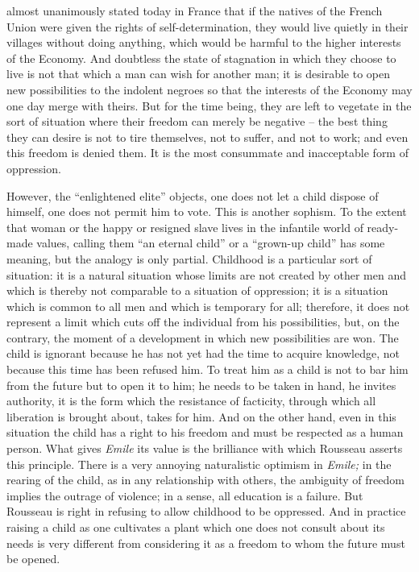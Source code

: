\documentclass[11pt]{article}
\begin{document}
{{almost unanimously stated today in France that if the natives of the French Union were given the rights of self-determination, they would live quietly in their villages without doing anything, which would be harmful to the higher interests of the Economy. And doubtless the state of stagnation in which they choose to live is not that which a man can wish for another man; it is desirable to open new possibilities to the indolent negroes so that the interests of the Economy may one day merge with theirs. But for the time being, they are left to vegetate in the sort of situation where their freedom can merely be negative – the best thing they can desire is not to tire themselves, not to suffer, and not to work; and even this freedom is denied them. It is the most consummate and inacceptable form of oppression.

However, the “enlightened elite” objects, one does not let a child dispose of himself, one does not permit him to vote. This is another sophism. To the extent that woman or the happy or resigned slave lives in the infantile world of ready-made values, calling them “an eternal child” or a “grown-up child” has some meaning, but the analogy is only partial. Childhood is a particular sort of situation: it is a natural situation whose limits are not created by other men and which is thereby not comparable to a situation of oppression; it is a situation which is common to all men and which is temporary for all; therefore, it does not represent a limit which cuts off the individual from his possibilities, but, on the contrary, the moment of a development in which new possibilities are won. The child is ignorant because he has not yet had the time to acquire knowledge, not because this time has been refused him. To treat him as a child is not to bar him from the future but to open it to him; he needs to be taken in hand, he invites authority, it is the form which the resistance of facticity, through which all liberation is brought about, takes for him. And on the other hand, even in this situation the child has a right to his freedom and must be respected as a human person. What gives \textit{Emile} its value is the brilliance with which Rousseau asserts this principle. There is a very annoying naturalistic optimism in \textit{Emile; }in the rearing of the child, as in any relationship with others, the ambiguity of freedom implies the outrage of violence; in a sense, all education is a failure. But Rousseau is right in refusing to allow childhood to be oppressed. And in practice raising a child as one cultivates a plant which one does not consult about its needs is very different from considering it as a freedom to whom the future must be opened.

}}
\end{document}
